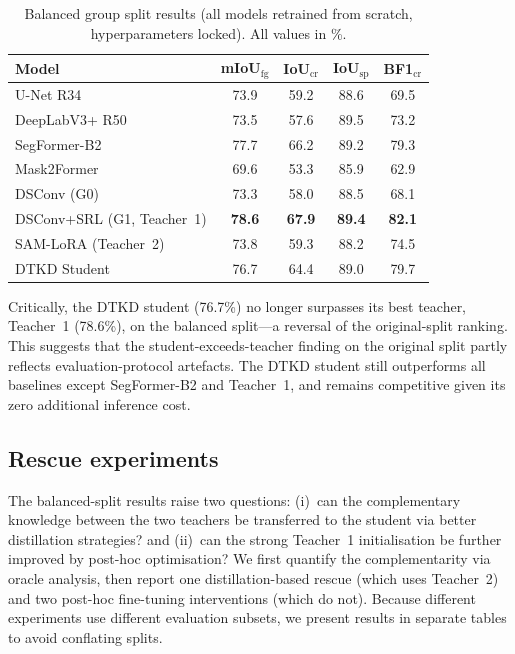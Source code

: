 \documentclass[review,authoryear]{elsarticle}
\begin{document}
\begin{table}[t]
\centering
\caption{Balanced group split results (all models retrained from scratch, hyperparameters locked). All values in \%.}
\label{tab:balanced_split}
\begin{tabular}{lcccc}
\toprule
Model & mIoU$_{\text{fg}}$ & IoU$_{\text{cr}}$ & IoU$_{\text{sp}}$ & BF1$_{\text{cr}}$ \\
\midrule
U-Net R34 & 73.9 & 59.2 & 88.6 & 69.5 \\
DeepLabV3+ R50 & 73.5 & 57.6 & 89.5 & 73.2 \\
SegFormer-B2 & 77.7 & 66.2 & 89.2 & 79.3 \\
Mask2Former & 69.6 & 53.3 & 85.9 & 62.9 \\
\midrule
DSConv (G0) & 73.3 & 58.0 & 88.5 & 68.1 \\
DSConv+SRL (G1, Teacher~1) & \textbf{78.6} & \textbf{67.9} & \textbf{89.4} & \textbf{82.1} \\
SAM-LoRA (Teacher~2) & 73.8 & 59.3 & 88.2 & 74.5 \\
\midrule
DTKD Student & 76.7 & 64.4 & 89.0 & 79.7 \\
\bottomrule
\end{tabular}
\end{table}

Critically, the DTKD student (76.7\%) no longer surpasses its best teacher, Teacher~1 (78.6\%), on the balanced split---a reversal of the original-split ranking.
This suggests that the student-exceeds-teacher finding on the original split partly reflects evaluation-protocol artefacts.
The DTKD student still outperforms all baselines except SegFormer-B2 and Teacher~1, and remains competitive given its zero additional inference cost.

\subsection{Rescue experiments}
\label{sec:rescue}

The balanced-split results raise two questions: (i)~can the complementary knowledge between the two teachers be transferred to the student via better distillation strategies? and (ii)~can the strong Teacher~1 initialisation be further improved by post-hoc optimisation?
We first quantify the complementarity via oracle analysis, then report one distillation-based rescue (which uses Teacher~2) and two post-hoc fine-tuning interventions (which do not).
Because different experiments use different evaluation subsets, we present results in separate tables to avoid conflating splits.
\end{document}
